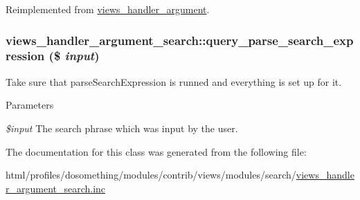 Reimplemented from \hyperlink{classviews__handler__argument_af9ddabf5d386782c8ffc5785b7ae4263}{views\_\-handler\_\-argument}.\hypertarget{classviews__handler__argument__search_ad44b53922da6f75b7371457ddb9a99c8}{
\subsubsection[{query\_\-parse\_\-search\_\-expression}]{\setlength{\rightskip}{0pt plus 5cm}views\_\-handler\_\-argument\_\-search::query\_\-parse\_\-search\_\-expression (\$ {\em input})}}
\label{classviews__handler__argument__search_ad44b53922da6f75b7371457ddb9a99c8}
Take sure that parseSearchExpression is runned and everything is set up for it.


\begin{DoxyParams}{Parameters}
\item[{\em \$input}]The search phrase which was input by the user. \end{DoxyParams}


The documentation for this class was generated from the following file:\begin{DoxyCompactItemize}
\item 
html/profiles/dosomething/modules/contrib/views/modules/search/\hyperlink{views__handler__argument__search_8inc}{views\_\-handler\_\-argument\_\-search.inc}\end{DoxyCompactItemize}

